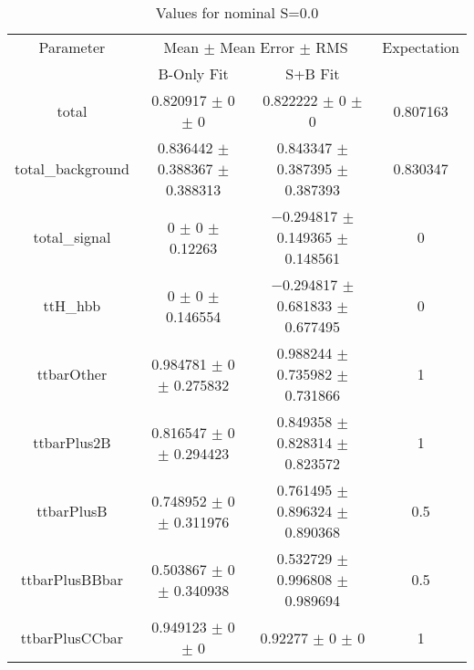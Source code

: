\begin{table}
\centering
\caption{Values for nominal S=0.0}
\begin{tabular}{cccc}
\toprule
Parameter & \multicolumn{2}{c}{Mean $\pm$ Mean Error $\pm$ RMS} & Expectation\\
 & B-Only Fit & S+B Fit & \\
\midrule
total & \num{0.820917} $\pm$ \num{0} $\pm$ \num{0} & \num{0.822222} $\pm$ \num{0} $\pm$ \num{0} & \num{0.807163}\\
total\_background & \num{0.836442} $\pm$ \num{0.388367} $\pm$ \num{0.388313} & \num{0.843347} $\pm$ \num{0.387395} $\pm$ \num{0.387393} & \num{0.830347}\\
total\_signal & \num{0} $\pm$ \num{0} $\pm$ \num{0.12263} & \num{-0.294817} $\pm$ \num{0.149365} $\pm$ \num{0.148561} & \num{0}\\
ttH\_hbb & \num{0} $\pm$ \num{0} $\pm$ \num{0.146554} & \num{-0.294817} $\pm$ \num{0.681833} $\pm$ \num{0.677495} & \num{0}\\
ttbarOther & \num{0.984781} $\pm$ \num{0} $\pm$ \num{0.275832} & \num{0.988244} $\pm$ \num{0.735982} $\pm$ \num{0.731866} & \num{1}\\
ttbarPlus2B & \num{0.816547} $\pm$ \num{0} $\pm$ \num{0.294423} & \num{0.849358} $\pm$ \num{0.828314} $\pm$ \num{0.823572} & \num{1}\\
ttbarPlusB & \num{0.748952} $\pm$ \num{0} $\pm$ \num{0.311976} & \num{0.761495} $\pm$ \num{0.896324} $\pm$ \num{0.890368} & \num{0.5}\\
ttbarPlusBBbar & \num{0.503867} $\pm$ \num{0} $\pm$ \num{0.340938} & \num{0.532729} $\pm$ \num{0.996808} $\pm$ \num{0.989694} & \num{0.5}\\
ttbarPlusCCbar & \num{0.949123} $\pm$ \num{0} $\pm$ \num{0} & \num{0.92277} $\pm$ \num{0} $\pm$ \num{0} & \num{1}\\
\bottomrule
\end{tabular}
\end{table}